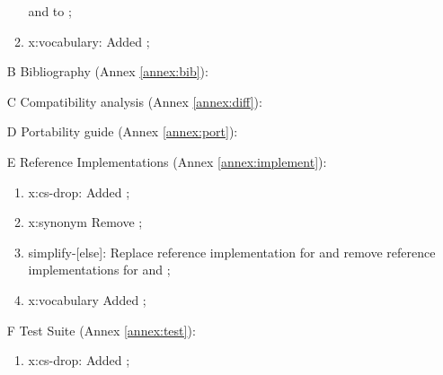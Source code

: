 \begin{itemize}
\begin{enumerate}
			 and  to
			;
		\item \textsf{x:vocabulary}: Added ;
		\end{enumerate}
	\item[B] Bibliography (Annex \ref{annex:bib}):		%
	\item[C] Compatibility analysis (Annex \ref{annex:diff}):	%
	\item[D] Portability guide (Annex \ref{annex:port}):		%
	\item[E] Reference Implementations (Annex \ref{annex:implement}): %
		\begin{enumerate}
		\item \textsf{x:cs-drop}: Added ;
		\item \textsf{x:synonym} Remove ; %
		\item \textsf{simplify-[else]}: Replace reference implementation for
			 and remove reference implementations
			for  and ;
		\item \textsf{x:vocabulary} Added ;
		\end{enumerate}
	\item[F] Test Suite (Annex \ref{annex:test}):	%
		\begin{enumerate}
		\item \textsf{x:cs-drop}: Added ;
		\end{enumerate}
	\end{itemize}

\endinput



